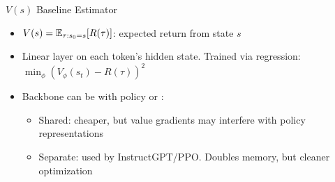 \begin{frame}{$V(s)$ Baseline Estimator}
  \vspace{-0.3em}
  \begin{itemize}[nosep]
    \item {} $V(s) = \mathbb{E}_{\tau : s_0 = s}[R(\tau)]$: expected return from state $s$
    \item Linear layer on each token's hidden state. Trained via regression: $\min_\phi (V_\phi(s_t) - R(\tau))^2$
    \item Backbone can be  with policy or :
      \begin{itemize}[nosep]
        \item Shared: cheaper, but value gradients may interfere with policy representations
        \item Separate: used by InstructGPT/PPO. Doubles memory, but cleaner optimization
      \end{itemize}
  \end{itemize}
\end{frame}

